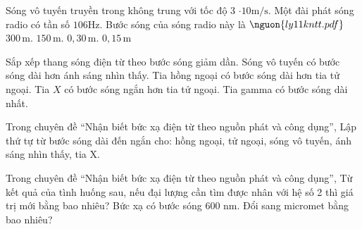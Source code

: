 \begin{ex}
Sóng vô tuyến truyền trong không trung với tốc độ 3 $\cdot10 \mathrm{m/s}$. Một đài phát sóng radio có tần số $106 \mathrm{Hz}$. Bước sóng của sóng radio này là $\nguon{ly11 kntt.pdf}$
\choice
{\True $300\,\text{m}$.}
{$150\,\text{m}$.}
{$0,30\,\text{m}$.}
{$0,15\,\text{m}$}
\end{ex}

\begin{ex}
Sắp xếp thang sóng điện từ theo bước sóng giảm dần.
\choiceTF
{\True Sóng vô tuyến có bước sóng dài hơn ánh sáng nhìn thấy.}
{\True Tia hồng ngoại có bước sóng dài hơn tia tử ngoại.}
{\True Tia $X$ có bước sóng ngắn hơn tia tử ngoại.}
{Tia gamma có bước sóng dài nhất.}
\end{ex}

\begin{ex}
Trong chuyên đề “Nhận biết bức xạ điện từ theo nguồn phát và công dụng”, Lập thứ tự từ bước sóng dài đến ngắn cho: hồng ngoại, tử ngoại, sóng vô tuyến, ánh sáng nhìn thấy, tia X.
\choiceTF

\end{ex}

\begin{ex}
Trong chuyên đề “Nhận biết bức xạ điện từ theo nguồn phát và công dụng”, Từ kết quả của tình huống sau, nếu đại lượng cần tìm được nhân với hệ số 2 thì giá trị mới bằng bao nhiêu? Bức xạ có bước sóng 600 nm. Đổi sang micromet bằng bao nhiêu?
\end{ex}

